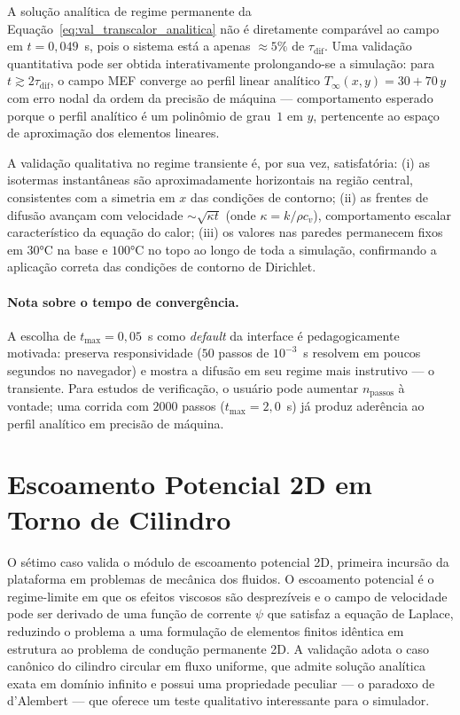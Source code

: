 A solução analítica de regime permanente da Equação~\eqref{eq:val_transcalor_analitica} não é diretamente comparável ao campo em $t = 0{,}049$~s, pois o sistema está a apenas $\approx 5\%$ de $\tau_{\mathrm{dif}}$. Uma validação quantitativa pode ser obtida interativamente prolongando-se a simulação: para $t \gtrsim 2\tau_{\mathrm{dif}}$, o campo MEF converge ao perfil linear analítico $T_{\infty}(x, y) = 30 + 70\,y$ com erro nodal da ordem da precisão de máquina --- comportamento esperado porque o perfil analítico é um polinômio de grau~$1$ em $y$, pertencente ao espaço de aproximação dos elementos lineares.

A validação qualitativa no regime transiente é, por sua vez, satisfatória: (i) as isotermas instantâneas são aproximadamente horizontais na região central, consistentes com a simetria em $x$ das condições de contorno; (ii) as frentes de difusão avançam com velocidade $\sim \sqrt{\kappa t}$ (onde $\kappa = k / \rho c_v$), comportamento escalar característico da equação do calor; (iii) os valores nas paredes permanecem fixos em $30$°C na base e $100$°C no topo ao longo de toda a simulação, confirmando a aplicação correta das condições de contorno de Dirichlet.

\paragraph{Nota sobre o tempo de convergência.} A escolha de $t_{\max} = 0{,}05$~s como \emph{default} da interface é pedagogicamente motivada: preserva responsividade ($50$ passos de $10^{-3}$~s resolvem em poucos segundos no navegador) e mostra a difusão em seu regime mais instrutivo --- o transiente. Para estudos de verificação, o usuário pode aumentar $n_{\mathrm{passos}}$ à vontade; uma corrida com $2000$ passos ($t_{\max} = 2{,}0$~s) já produz aderência ao perfil analítico em precisão de máquina.


\section{Escoamento Potencial 2D em Torno de Cilindro}
\label{sec:val_potencial}

O sétimo caso valida o módulo de escoamento potencial 2D, primeira incursão da plataforma em problemas de mecânica dos fluidos. O escoamento potencial é o regime-limite em que os efeitos viscosos são desprezíveis e o campo de velocidade pode ser derivado de uma função de corrente $\psi$ que satisfaz a equação de Laplace, reduzindo o problema a uma formulação de elementos finitos idêntica em estrutura ao problema de condução permanente 2D. A validação adota o caso canônico do cilindro circular em fluxo uniforme, que admite solução analítica exata em domínio infinito e possui uma propriedade peculiar --- o paradoxo de d'Alembert --- que oferece um teste qualitativo interessante para o simulador.

